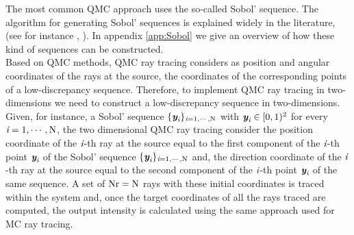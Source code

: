 The most common QMC approach uses the so-called Sobol' sequence. The algorithm for generating Sobol' sequences is explained widely in the literature, (see for instance , \cite{bratley1988algorithm}). In appendix \ref{app:Sobol} we give an overview of how these kind of sequences can be constructed.
\\ \indent Based on QMC methods, QMC ray tracing considers as position and angular coordinates of the rays at the source, the coordinates of the corresponding points of a low-discrepancy sequence. 
Therefore, to implement QMC ray tracing in two-dimensions we need to construct a low-discrepancy sequence in two-dimensions.  
Given, for instance, a Sobol' sequence $\{\textit{\textbf{y}}_{\textit{i}}\}_{\textit{i}=1, \cdots, \textrm{N}}$ with $\textit{\textbf{y}}_{\textit{i}}\in[0,1)^2$ for every $\textit{i}=1, \cdots, \textrm{N}$, the two dimensional QMC ray tracing consider the position coordinate of the $\textit{i}$-th ray at the source equal to the first component of the $\textit{i}$-th point 
$\textit{\textbf{y}}_{\textit{i}}$ of the Sobol' sequence  $\{\textit{\textbf{y}}_{\textit{i}}\}_{\textit{i}=1, \cdots, \textrm{N}}$ and, the direction coordinate of the $\textit{i}$-th ray at the source equal to the second component of the $\textit{i}$-th point 
$\textit{\textbf{y}}_{\textit{i}}$ of the same sequence. A set of $\textrm{Nr} = \textrm{N}$ rays with these initial coordinates is traced within the system and, once the target coordinates of all the rays traced are computed, the output intensity is calculated using the same approach used for MC ray tracing.\\ \indent
